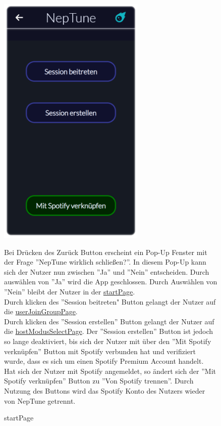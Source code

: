 \documentclass[oneside, ngerman]{sdqtechreport}
\begin{document}
\begin{figure}
    \hypertarget{startPage}{}
    \begin{minipage}[t]{7 cm}
        \vspace{-1.5ex}
        \includegraphics[width=7cm]{LATEX/Pflichtenheft/GraphicDesigns/startPage.png}
        \caption{startPage}
    \end{minipage}
    \hspace{1cm}
    \begin{minipage}[t]{7 cm}
        \vspace{1cm}
        Bei Drücken des Zurück Button erscheint ein Pop-Up Fenster mit der Frage ''NepTune wirklich schließen?''. In diesem Pop-Up kann sich der Nutzer nun zwischen ''Ja'' und ''Nein'' entscheiden. Durch auswählen von ''Ja'' wird die App geschlossen. Durch Auswählen von ''Nein'' bleibt der Nutzer in der \hyperlink{startPage}{startPage}.\\
        Durch klicken des ''Session beitreten" Button gelangt der Nutzer auf die \hyperlink{userJoinGroupPage}{userJoinGroupPage}. \\
        Durch klicken des ''Session erstellen'' Button gelangt der Nutzer auf die \hyperlink{hostModusSelectPage}{hostModusSelectPage}. Der ''Session erstellen'' Button ist jedoch so lange deaktiviert, bis sich der Nutzer mit über den ''Mit Spotify verknüpfen'' Button mit Spotify verbunden hat und verifiziert wurde, dass es sich um einen Spotify Premium Account handelt.\\
        Hat sich der Nutzer mit Spotify angemeldet, so ändert sich der ''Mit Spotify verknüpfen'' Button zu ''Von Spotify trennen''. Durch Nutzung des Buttons wird das Spotify Konto des Nutzers wieder von NepTune getrennt.
    \end{minipage}
\end{figure}
\end{document}
